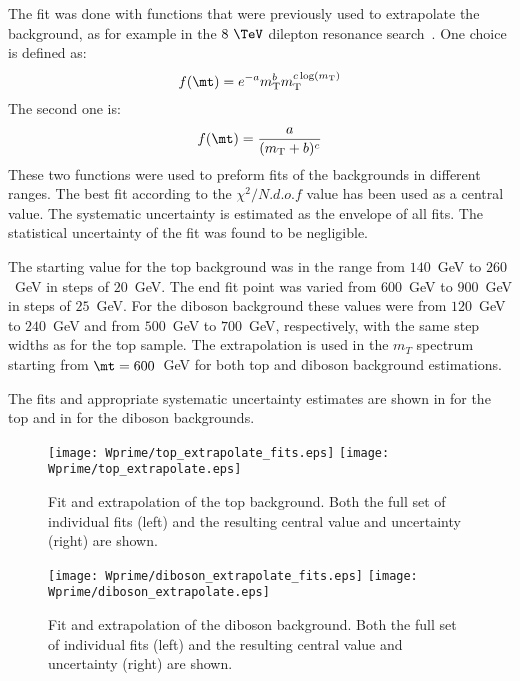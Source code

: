 The fit was done with functions that were previously used to extrapolate the background, as for example in the $8~\TeV$ dilepton resonance search~\cite{Aad:2014cka}.
One choice is defined as:
\begin{equation}
 f(\mt) = e^{-a} m_\mathrm{T}^{b} m_\mathrm{T}^{c \log(m_\mathrm{T})}
  \label{eq:dijetfunc}
\end{equation}
The second one is:
\begin{equation}
 f(\mt) = \frac{a}{(m_\mathrm{T}+b)^{c}}
  \label{eq:powerlaw}
\end{equation}
These two functions were used to preform fits of the backgrounds in different ranges. 
The best fit according to the $\chi^{2}/N.d.o.f$ value has been used as a central value.
The systematic uncertainty is estimated as the envelope of all fits.
The statistical uncertainty of the fit was found to be negligible.

The starting value for the top background was in the range from $140$~GeV to $260$~GeV in steps of $20$~GeV. The end fit point was varied from $600$~GeV to $900$~GeV in steps of $25$~GeV.
For the diboson background these values were from $120$~GeV to $240$~GeV and from $500$~GeV to $700$~GeV, respectively, with the same step widths as for the top sample.
The extrapolation is used in the $m_T$ spectrum starting from $\mt=600$~GeV for both top and diboson background estimations.

The fits and appropriate systematic uncertainty estimates are shown in 
 for the top and in  for the diboson backgrounds.
\begin{figure}[!htb]
  \centering
  \texttt{[image: Wprime/top\_extrapolate\_fits.eps]}
  \texttt{[image: Wprime/top\_extrapolate.eps]}
  \caption{Fit and extrapolation of the top background. Both the full set of individual
fits (left) and the resulting central value and uncertainty (right) are shown.}
  \label{fig:mu_extrapolate_top}
\end{figure}
\begin{figure}[!htb]
  \centering
  \texttt{[image: Wprime/diboson\_extrapolate\_fits.eps]}
  \texttt{[image: Wprime/diboson\_extrapolate.eps]}
  \caption{Fit and extrapolation of the diboson background. Both the full set of individual
fits (left) and the resulting central value and uncertainty (right) are shown.}
  \label{fig:mu_extrapolate_diboson}
\end{figure}

